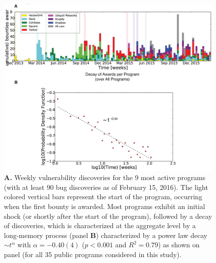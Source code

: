 \begin{figure}[Ht]
\begin{center}
\includegraphics[width=13cm]{figures/timeline.eps}
\caption{{\bf A.} Weekly vulnerability discoveries for the 9 most active programs (with at least 90 bug discoveries as of February 15, 2016). The light colored vertical bars represent the start of the program, occurring when the first bounty is awarded. Most programs exhibit an initial shock (or shortly after the start of the program), followed by a decay of discoveries, which is characterized at the aggregate level by a long-memory process (panel {\bf B}) characterized by a power law decay $\sim t^{\alpha}$ with $\alpha = -0.40(4)$ ($p < 0.001$ and $R^2 = 0.79$) as shown on panel  (for all 35 public programs considered in this study).}
\label{timeline}
\end{center}
\end{figure}



